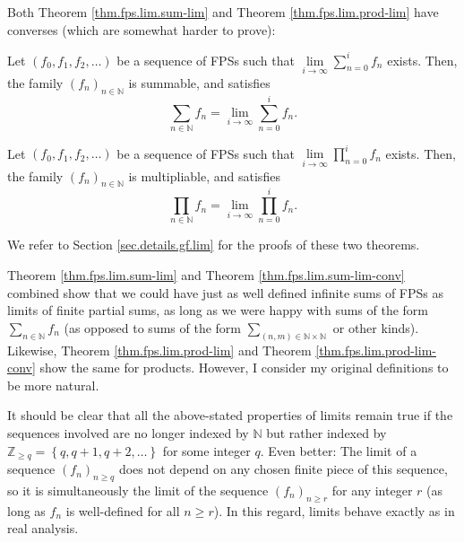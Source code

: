 Both Theorem \ref{thm.fps.lim.sum-lim} and Theorem \ref{thm.fps.lim.prod-lim}
have converses (which are somewhat harder to prove):

\begin{theorem}
\label{thm.fps.lim.sum-lim-conv}Let $\left(  f_{0},f_{1},f_{2},\ldots\right)
$ be a sequence of FPSs such that $\lim\limits_{i\rightarrow\infty}\sum
_{n=0}^{i}f_{n}$ exists. Then, the family $\left(  f_{n}\right)
_{n\in\mathbb{N}}$ is summable, and satisfies%
\[
\sum_{n\in\mathbb{N}}f_{n}=\lim\limits_{i\rightarrow\infty}\sum_{n=0}^{i}%
f_{n}.
\]

\end{theorem}

\begin{theorem}
\label{thm.fps.lim.prod-lim-conv}Let $\left(  f_{0},f_{1},f_{2},\ldots\right)
$ be a sequence of FPSs such that $\lim\limits_{i\rightarrow\infty}\prod
_{n=0}^{i}f_{n}$ exists. Then, the family $\left(  f_{n}\right)
_{n\in\mathbb{N}}$ is multipliable, and satisfies%
\[
\prod_{n\in\mathbb{N}}f_{n}=\lim\limits_{i\rightarrow\infty}\prod_{n=0}%
^{i}f_{n}.
\]

\end{theorem}

We refer to Section \ref{sec.details.gf.lim} for the proofs of these two theorems.

Theorem \ref{thm.fps.lim.sum-lim} and Theorem \ref{thm.fps.lim.sum-lim-conv}
combined show that we could have just as well defined infinite sums of FPSs as
limits of finite partial sums, as long as we were happy with sums of the form
$\sum_{n\in\mathbb{N}}f_{n}$ (as opposed to sums of the form $\sum_{\left(
n,m\right)  \in\mathbb{N}\times\mathbb{N}}$ or other kinds). Likewise, Theorem
\ref{thm.fps.lim.prod-lim} and Theorem \ref{thm.fps.lim.prod-lim-conv} show
the same for products. However, I consider my original definitions to be more
natural. \medskip

It should be clear that all the above-stated properties of limits remain true
if the sequences involved are no longer indexed by $\mathbb{N}$ but rather
indexed by $\mathbb{Z}_{\geq q}=\left\{  q,q+1,q+2,\ldots\right\}  $ for some
integer $q$. Even better: The limit of a sequence $\left(  f_{n}\right)
_{n\geq q}$ does not depend on any chosen finite piece of this sequence, so it
is simultaneously the limit of the sequence $\left(  f_{n}\right)  _{n\geq r}$
for any integer $r$ (as long as $f_{n}$ is well-defined for all $n\geq r$). In
this regard, limits behave exactly as in real analysis.
